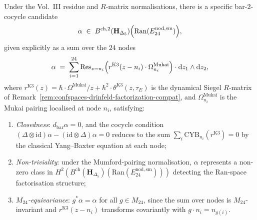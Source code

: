 \begin{theorem}
\label{thm:confspaces-ran-space-cocycle-witness}
\ClaimStatusConditional
Under the Vol.~III residue and $R$-matrix normalisations, there is a
specific bar-$2$-cocycle candidate
\begin{equation}
\label{eq:confspaces-ran-cocycle-witness}
 \alpha \;\in\; B^{\mathrm{ch},2}(\mathbf{H}_{\Delta_5})
 \Bigl(\mathrm{Ran}(E^{\mathrm{nod,sm}}_{24})\Bigr),
\end{equation}
given explicitly as a sum over the $24$ nodes
\begin{equation}
\label{eq:confspaces-ran-cocycle-explicit}
 \alpha \;=\; \sum_{i=1}^{24}
 \mathrm{Res}_{z=n_i}\Bigl(
 r^{\mathrm{K3}}(z-n_i)\cdot\Omega^{\mathrm{Mukai}}_{n_i}
 \Bigr)\cdot\mathrm{d}z_1\wedge\mathrm{d}z_2,
\end{equation}
where $r^{\mathrm{K3}}(z) = \hbar\cdot\Omega^{\mathrm{Mukai}}/z
+ \hbar^2\cdot\theta^{\mathrm{K3}}(z,\tau_E)$ is the dynamical Siegel
$R$-matrix of Remark~\ref{rem:confspaces-drinfeld-factorization-compat},
and $\Omega^{\mathrm{Mukai}}_{n_i}$ is the Mukai pairing localised at
node $n_i$, satisfying:
\begin{enumerate}[label=\textup{(\roman*)}, leftmargin=2.2em]
\item \emph{Closedness}: $d_{\mathrm{bar}}\alpha = 0$, and the cocycle
 condition
 $(\Delta\otimes\mathrm{id})\alpha - (\mathrm{id}\otimes\Delta)\alpha = 0$
 reduces to the sum
 $\sum_i\mathrm{CYB}_{n_i}(r^{\mathrm{K3}}) = 0$ by the classical
 Yang--Baxter equation at each node;
\item \emph{Non-triviality}: under the Mumford-pairing normalisation,
$\alpha$ represents a non-zero class in
 $H^2(B^{\mathrm{ch}}(\mathbf{H}_{\Delta_5})
 (\mathrm{Ran}(E^{\mathrm{nod,sm}}_{24})))$ detecting the Ran-space
 factorisation structure;
\item \emph{$M_{24}$-equivariance}: $g^*\alpha = \alpha$ for all
 $g\in M_{24}$, since the sum over nodes is $M_{24}$-invariant and
 $r^{\mathrm{K3}}(z-n_i)$ transforms covariantly with
 $g\cdot n_i = n_{g(i)}$.
\end{enumerate}
\end{theorem}

